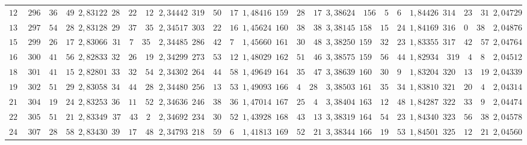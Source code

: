 \begin{landscape}
\begin{center}
\begin{tabular}{r|r|r|r|r|r|r|r|r|r|r|r|r}
\(120\) & \(296\quad 36\quad 49\) & \(2{,}83122\) & \(28\quad 22\quad 12\) & \(2{,}34442\) & \(319\quad 50\quad 17\) & \(1{,}48416\) & \(159\quad 28\quad 17\) & \(3{,}38624\) & \(156\quad 5\quad 6\) & \(1{,}84426\) & \(314\quad 23\quad 31\) & \(2{,}04729\) \\
\(135\) & \(297\quad 54\quad 28\) & \(2{,}83128\) & \(29\quad 37\quad 35\) & \(2{,}34517\) & \(303\quad 22\quad 16\) & \(1{,}45624\) & \(160\quad 38\quad 38\) & \(3{,}38145\) & \(158\quad 15\quad 24\) & \(1{,}84169\) & \(316\quad 0\quad 38\) & \(2{,}04876\) \\
\(150\) & \(299\quad 26\quad 17\) & \(2{,}83066\) & \(31\quad 7\quad 35\) & \(2{,}34485\) & \(286\quad 42\quad 7\) & \(1{,}45660\) & \(161\quad 30\quad 48\) & \(3{,}38250\) & \(159\quad 32\quad 23\) & \(1{,}83355\) & \(317\quad 42\quad 57\) & \(2{,}04764\) \\
\(165\) & \(300\quad 41\quad 56\) & \(2{,}82833\) & \(32\quad 26\quad 19\) & \(2{,}34299\) & \(273\quad 53\quad 12\) & \(1{,}48029\) & \(162\quad 51\quad 46\) & \(3{,}38575\) & \(159\quad 56\quad 44\) & \(1{,}82934\) & \(319\quad 4\quad 8\) & \(2{,}04512\) \\[3pt]
\(180\) & \(301\quad 41\quad 15\) & \(2{,}82801\) & \(33\quad 32\quad 54\) & \(2{,}34302\) & \(264\quad 44\quad 58\) & \(1{,}49649\) & \(164\quad 35\quad 47\) & \(3{,}38639\) & \(160\quad 30\quad 9\) & \(1{,}83204\) & \(320\quad 13\quad 19\) & \(2{,}04339\) \\
\(195\) & \(302\quad 51\quad 29\) & \(2{,}83058\) & \(34\quad 44\quad 28\) & \(2{,}34480\) & \(256\quad 13\quad 53\) & \(1{,}49093\) & \(166\quad 4\quad 28\) & \(3{,}38503\) & \(161\quad 35\quad 34\) & \(1{,}83810\) & \(321\quad 20\quad 4\) & \(2{,}04314\) \\
\(210\) & \(304\quad 19\quad 24\) & \(2{,}83253\) & \(36\quad 11\quad 52\) & \(2{,}34636\) & \(246\quad 38\quad 36\) & \(1{,}47014\) & \(167\quad 25\quad 4\) & \(3{,}38404\) & \(163\quad 12\quad 48\) & \(1{,}84287\) & \(322\quad 33\quad 9\) & \(2{,}04474\) \\
\(225\) & \(305\quad 51\quad 21\) & \(2{,}83349\) & \(37\quad 43\quad 2\) & \(2{,}34692\) & \(234\quad 30\quad 52\) & \(1{,}43928\) & \(168\quad 43\quad 13\) & \(3{,}38319\) & \(164\quad 54\quad 23\) & \(1{,}84340\) & \(323\quad 56\quad 38\) & \(2{,}04578\) \\[3pt]
\(240\) & \(307\quad 28\quad 58\) & \(2{,}83430\) & \(39\quad 17\quad 48\) & \(2{,}34793\) & \(218\quad 59\quad 6\) & \(1{,}41813\) & \(169\quad 52\quad 21\) & \(3{,}38344\) & \(166\quad 19\quad 53\) & \(1{,}84501\) & \(325\quad 12\quad 21\) & \(2{,}04560\) \\

\end{tabular}
\end{center}
\end{landscape}
